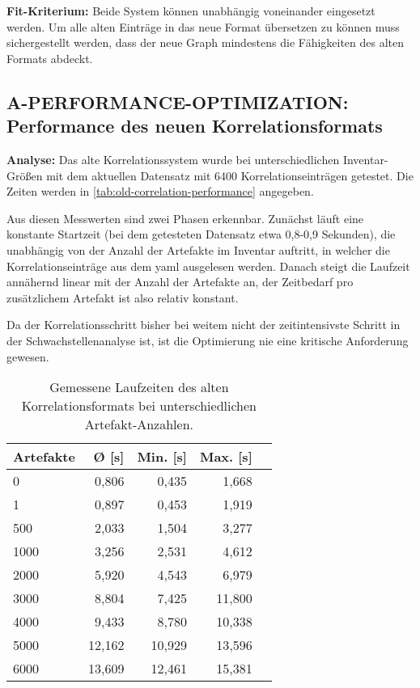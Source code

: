 \textbf{Fit-Kriterium:}
Beide System können unabhängig voneinander eingesetzt werden.
Um alle alten Einträge in das neue Format übersetzen zu können muss sichergestellt werden, dass der neue Graph mindestens die Fähigkeiten des alten Formats abdeckt.

\subsection{A-PERFORMANCE-OPTIMIZATION: Performance des neuen Korrelationsformats}\label{subsec:req-correlation-format-performance}

\textbf{Analyse:}
Das alte Korrelationssystem wurde bei unterschiedlichen Inventar-Größen mit dem aktuellen Datensatz mit 6400 Korrelationseinträgen getestet.
Die Zeiten werden in \autoref{tab:old-correlation-performance} angegeben.

Aus diesen Messwerten sind zwei Phasen erkennbar.
Zunächst läuft eine konstante Startzeit (bei dem getesteten Datensatz etwa 0,8-0,9 Sekunden), die unabhängig von der Anzahl der Artefakte im Inventar auftritt, in welcher die Korrelationseinträge aus dem \acrshort{yaml} ausgelesen werden.
Danach steigt die Laufzeit annähernd linear mit der Anzahl der Artefakte an, der Zeitbedarf pro zusätzlichem Artefakt ist also relativ konstant.

Da der Korrelationsschritt bisher bei weitem nicht der zeitintensivste Schritt in der Schwachstellenanalyse ist, ist die Optimierung nie eine kritische Anforderung gewesen.

\begin{table}[h!]
    \centering
    \begin{tabular}{l r r r r}
        \toprule
        \textbf{Artefakte} & \textbf{Ø [s]} & \textbf{Min. [s]} & \textbf{Max. [s]} \\
        \midrule
        0                  & 0,806          & 0,435             & 1,668             \\
        1                  & 0,897          & 0,453             & 1,919             \\
        500                & 2,033          & 1,504             & 3,277             \\
        1000               & 3,256          & 2,531             & 4,612             \\
        2000               & 5,920          & 4,543             & 6,979             \\
        3000               & 8,804          & 7,425             & 11,800            \\
        4000               & 9,433          & 8,780             & 10,338            \\
        5000               & 12,162         & 10,929            & 13,596            \\
        6000               & 13,609         & 12,461            & 15,381            \\
        \bottomrule
    \end{tabular}
    \caption{Gemessene Laufzeiten des alten Korrelationsformats bei unterschiedlichen Artefakt-Anzahlen.}
    \label{tab:old-correlation-performance}
\end{table}

